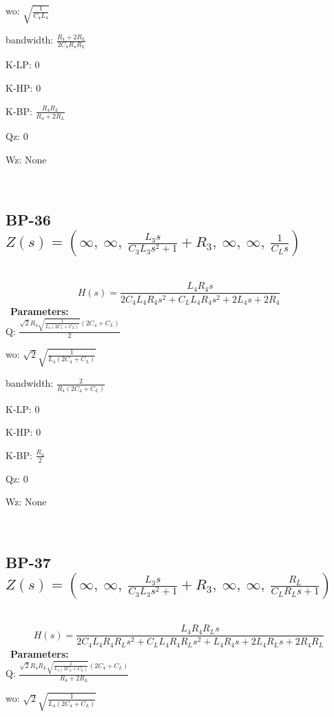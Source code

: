 \documentclass{article}
\begin{document}
wo: $\sqrt{\frac{1}{C_{4} L_{4}}}$\ 

bandwidth: $\frac{R_{4} + 2 R_{L}}{2 C_{4} R_{4} R_{L}}$\ 

K-LP: $0$\ 

K-HP: $0$\ 

K-BP: $\frac{R_{4} R_{L}}{R_{4} + 2 R_{L}}$\ 

Qz: $0$\ 

Wz: $\text{None}$\ 

\ 

\subsection{BP-36 $Z(s) = \left( \infty, \  \infty, \  \frac{L_{3} s}{C_{3} L_{3} s^{2} + 1} + R_{3}, \  \infty, \  \infty, \  \frac{1}{C_{L} s}\right)$ } \ 
\textbf{\[H(s) = \frac{L_{4} R_{4} s}{2 C_{4} L_{4} R_{4} s^{2} + C_{L} L_{4} R_{4} s^{2} + 2 L_{4} s + 2 R_{4}}\] } \ 
\textbf{Parameters:}\\ 

Q: $\frac{\sqrt{2} R_{4} \sqrt{\frac{1}{L_{4} \left(2 C_{4} + C_{L}\right)}} \left(2 C_{4} + C_{L}\right)}{2}$\ 

wo: $\sqrt{2} \sqrt{\frac{1}{L_{4} \left(2 C_{4} + C_{L}\right)}}$\ 

bandwidth: $\frac{2}{R_{4} \left(2 C_{4} + C_{L}\right)}$\ 

K-LP: $0$\ 

K-HP: $0$\ 

K-BP: $\frac{R_{4}}{2}$\ 

Qz: $0$\ 

Wz: $\text{None}$\ 

\ 

\subsection{BP-37 $Z(s) = \left( \infty, \  \infty, \  \frac{L_{3} s}{C_{3} L_{3} s^{2} + 1} + R_{3}, \  \infty, \  \infty, \  \frac{R_{L}}{C_{L} R_{L} s + 1}\right)$ } \ 
\textbf{\[H(s) = \frac{L_{4} R_{4} R_{L} s}{2 C_{4} L_{4} R_{4} R_{L} s^{2} + C_{L} L_{4} R_{4} R_{L} s^{2} + L_{4} R_{4} s + 2 L_{4} R_{L} s + 2 R_{4} R_{L}}\] } \ 
\textbf{Parameters:}\\ 

Q: $\frac{\sqrt{2} R_{4} R_{L} \sqrt{\frac{1}{L_{4} \left(2 C_{4} + C_{L}\right)}} \left(2 C_{4} + C_{L}\right)}{R_{4} + 2 R_{L}}$\ 

wo: $\sqrt{2} \sqrt{\frac{1}{L_{4} \left(2 C_{4} + C_{L}\right)}}$\ 
\end{document}
